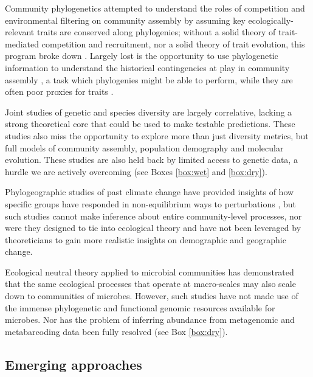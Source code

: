 \documentclass[12pt]{article}
\newcounter{Box}
\begin{document}
Community phylogenetics \citep{Webb2002-yr} attempted to understand the
roles of competition and environmental filtering on community assembly
by assuming key ecologically-relevant traits are conserved along
phylogenies; without a solid theory of trait-mediated competition and
recruitment, nor a solid theory of trait evolution, this program broke
down \citep{Losos2008-eq}. Largely lost is the opportunity to use
phylogenetic information to understand the historical contingencies at
play in community assembly \citep{Ricklefs2007-wo,Emerson2008-as}, a
task which phylogenies might be able to perform, while they are often
poor proxies for traits \citep{Losos2008-eq}.

Joint studies of genetic and species diversity
\citep{Vanoverbeke2015-ym, Vellend2005-up, Vellend2014-ir,
  Papadopoulou2011-bd} are largely correlative, lacking a strong
theoretical core that could be used to make testable
predictions. These studies also miss the opportunity to explore more
than just diversity metrics, but full models of community assembly,
population demography and molecular evolution.  These studies are also
held back by limited access to genetic data, a hurdle we are actively
overcoming (see Boxes \ref{box:wet} and \ref{box:dry}).

Phylogeographic studies of past climate change have provided insights
of how specific groups have responded in non-equilibrium ways to
perturbations \citep{Arbogast2001-jx, Smith2012-db, Hickerson2005-ek,
  Satler2016-lb}, but such studies cannot make inference about entire
community-level processes, nor were they designed to tie into
ecological theory and have not been leveraged by theoreticians to gain
more realistic insights on demographic and geographic change.

Ecological neutral theory applied to microbial communities
\citep{Venkataraman2015-rk} has demonstrated that the same ecological
processes that operate at macro-scales may also scale down to
communities of microbes. However, such studies have not made use of
the immense phylogenetic and functional genomic resources available
for microbes. Nor has the problem of inferring abundance from
metagenomic and metabarcoding data been fully resolved (see Box
\ref{box:dry}).

\subsection{Emerging approaches}
\end{document}
